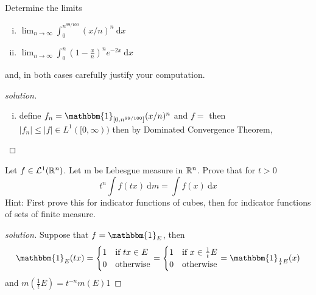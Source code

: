 \begin{problem}
  Determine the limits 
  \begin{enumerate}[(i)]
    \item $\lim_{n\to\infty} \int_0^{n^{99/100}} (x/n)^n\ \mathrm{d}x$
    \item $\lim_{n\to\infty} \int_0^n (1 - \frac xn)^n e^{-2x}\ \mathrm{d}x$
  \end{enumerate}
  and, in both cases carefully justify your computation.
\end{problem}
\begin{proof}[solution]
   \begin{enumerate}[(i)]
    \item define $f_n = \mathbbm{1}_{[0, n^{99/100}]} (x/n)^n$ 
    and $f = $ then $|f_n| \le |f| \in L^1([0, \infty))$ then by Dominated Convergence Theorem,
   \end{enumerate}
\end{proof}

\begin{problem}
  Let $f \in \mathcal{L}^1(\mathbb R^n)$. Let m be Lebesgue measure in $\mathbb R^n$. Prove that for $t > 0$
  \[t^n \int f(tx)\ \mathrm{d}m = \int f(x)\ \mathrm{d}x\]
Hint: First prove this for indicator functions of cubes, then for indicator
functions of sets of finite measure.
\end{problem}

\begin{proof}[solution]
  Suppose that $f = \mathbbm{1}_E$, then
  \[\mathbbm{1}_E(tx) = \begin{cases}
    1 & \text{if } tx \in E\\
    0 & \text{otherwise}
  \end{cases} = \begin{cases}
    1 & \text{if } x \in \frac1tE\\
    0 & \text{otherwise}
  \end{cases} = \mathbbm{1}_{\frac1tE}(x)\] 
  and $m(\frac1tE) = t^{-n}m(E)$1
\end{proof}

